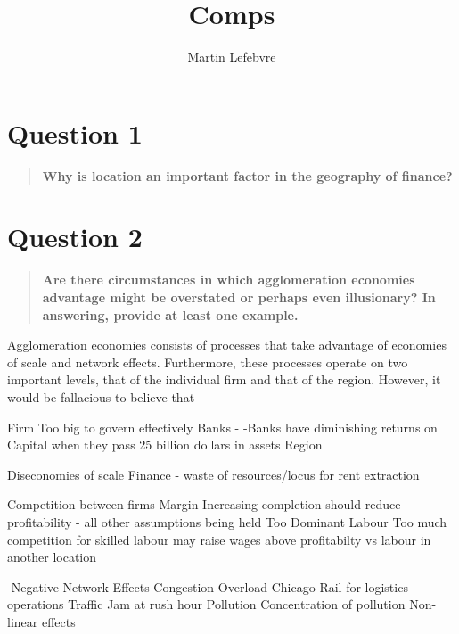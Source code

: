 \documentclass[12pt,letterpaper,notitlepage,onecolumn,final,openbib]{article}
\author{Martin Lefebvre}
\title{Comps}
\begin{document}
 
	
\section{Question 1}
\begin{quotation}
	\textbf{Why is location an important factor in the geography of finance?}
\end{quotation}



\section{Question 2}
\begin{quotation}
	\textbf{Are there circumstances in which agglomeration economies advantage might be overstated or perhaps even illusionary? In answering, provide at least one example.}
\end{quotation}

Agglomeration economies consists of processes that take advantage of economies of scale and network effects.  Furthermore, these processes operate on two important levels, that of the individual firm and that of the region.  However, it would be fallacious to believe that 

Firm  
Too big to govern effectively
	Banks - 	-Banks have diminishing returns on Capital when they pass 25 billion dollars in assets
Region \cite{Yves2010_Myths}

Diseconomies of scale
	Finance - waste of resources/locus for rent extraction

	Competition between firms
		Margin
			Increasing completion should reduce profitability - all other assumptions being held 
		Too Dominant
		Labour
			Too much competition for skilled labour may raise wages above profitabilty vs labour in another location
	
-Negative Network Effects
	Congestion
		Overload
			Chicago Rail for logistics operations
			Traffic Jam at rush hour
	Pollution
		Concentration of pollution 
			Non-linear effects
			
\end{document}
